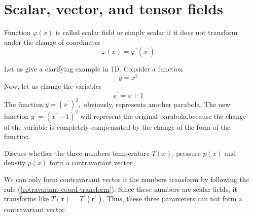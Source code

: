 \section{Scalar, vector, and tensor fields}
\begin{defi}
        Function $\varphi(x)$ is called scalar field or simply scalar if it does not transform under the change of coordinates
        \begin{equation}
\varphi(x)=\varphi^{\prime}\left(x^{\prime}\right)
\end{equation}
\end{defi}
Let us give a clarifying example in 1D. Consider a function
$$
y=x^2
$$
Now, let us change the variables 
$$
x^{\prime}=x+1
$$
The function $y=\left(x^{\prime}\right)^{2},$ obviously, represents another parabola.  The new function $y^{\prime}=\left(x^{\prime}-1\right)^{2}$ will represent the original parabola,because the change of the variable is completely compensated by the change of the form of the function.
\begin{mybox}
\begin{center}
    Discuss whether the three numbers temperature $T(x)$, pressure $p(x)$ and density $\rho(x)$ form a contravariant vector
\end{center}
\end{mybox}
\begin{mybox2}
We can only form contravariant vector if the numbers transform by following the rule (\ref{cotravariant-coord-transform}). Since these numbers are scalar fields, it transforms like $T(\mathbf{r})=T^{\prime}(\mathbf{r}^{\prime})$. Thus, these three parameters can not form a contravariant vector.
\end{mybox2}

